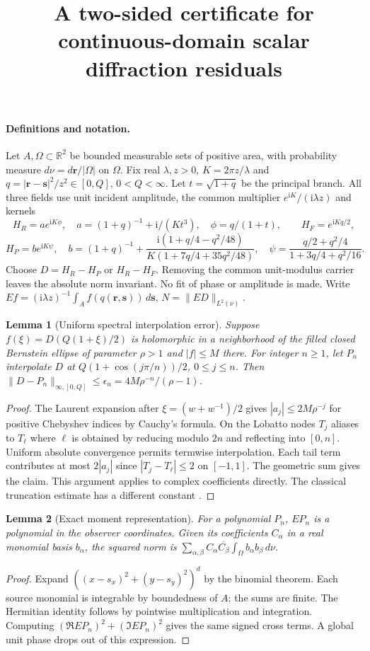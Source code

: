 \documentclass[11pt]{article}
\title{A two-sided certificate for continuous-domain scalar diffraction residuals}
\author{}\date{}
\newtheorem{lemma}{Lemma}
\newcommand{\ii}{\mathrm i}
\begin{document}
\maketitle
\paragraph{Definitions and notation.}
Let $A,\Omega\subset\mathbb R^2$ be bounded measurable sets of positive
area, with probability measure $d\nu=d\mathbf r/|\Omega|$ on $\Omega$.
Fix real $\lambda,z>0$, $K=2\pi z/\lambda$ and
$q=|\mathbf r-\mathbf s|^2/z^2\in[0,Q]$, $0<Q<\infty$. Let $t=\sqrt{1+q}$
be the principal branch. All three fields use unit incident amplitude,
the common multiplier $e^{\ii K}/(\ii\lambda z)$ and kernels
\[
 H_R=a e^{\ii K\phi},\quad a=(1+q)^{-1}+\ii/(Kt^3),\quad
 \phi=q/(1+t),\qquad H_F=e^{\ii Kq/2},
\]
\[
 H_P=b e^{\ii K\psi},\quad
 b=(1+q)^{-1}+\frac{\ii(1+q/4-q^2/48)}{K(1+7q/4+35q^2/48)},\quad
 \psi=\frac{q/2+q^2/4}{1+3q/4+q^2/16}.
\]
Choose $D=H_R-H_P$ or $H_R-H_F$. Removing the common unit-modulus
carrier leaves the absolute norm invariant. No fit of phase or amplitude is made.
Write $Ef=(\ii\lambda z)^{-1}\int_A f(q(\mathbf r,\mathbf s))\,d\mathbf s$,
$N=\|ED\|_{L^2(\nu)}$.

\begin{lemma}[Uniform spectral interpolation error]
Suppose $f(\xi)=D(Q(1+\xi)/2)$ is holomorphic in a neighborhood of
the filled closed Bernstein ellipse of parameter $\rho>1$ and $|f|\le M$
there. For integer $n\ge1$, let $P_n$ interpolate $D$ at
$Q(1+\cos(j\pi/n))/2$, $0\le j\le n$. Then
$\|D-P_n\|_{\infty,[0,Q]}\le\epsilon_n=4M\rho^{-n}/(\rho-1)$.
\end{lemma}
\begin{proof}
The Laurent expansion after $\xi=(w+w^{-1})/2$ gives
$|a_j|\le2M\rho^{-j}$ for positive Chebyshev indices by Cauchy's formula.
On the Lobatto nodes $T_j$ aliases to $T_{\ell}$ where $\ell$ is obtained
by reducing modulo $2n$ and reflecting into $[0,n]$. Uniform absolute
convergence permits termwise interpolation. Each tail term contributes at
most $2|a_j|$ since $|T_j-T_\ell|\le2$ on $[-1,1]$. The geometric
sum gives the claim. This argument applies to complex coefficients
directly. The classical truncation estimate has a different constant
\cite[Thm.~8.2]{tref}.
\end{proof}

\begin{lemma}[Exact moment representation]
For a polynomial $P_n$, $EP_n$ is a polynomial in the observer coordinates.
Given its coefficients $C_\alpha$ in a real monomial basis $b_\alpha$,
the squared norm is $\sum_{\alpha,\beta} C_\alpha\overline{C_\beta}
\int_\Omega b_\alpha b_\beta\,d\nu$.
\end{lemma}
\begin{proof}
Expand $((x-s_x)^2+(y-s_y)^2)^d$ by the binomial theorem. Each
source monomial is integrable by boundedness of $A$; the sums are
finite. The Hermitian identity follows by pointwise multiplication and
integration. Computing $(\Re EP_n)^2+(\Im EP_n)^2$ gives the same
signed cross terms. A global unit phase drops out of this expression.
\end{proof}
\end{document}

